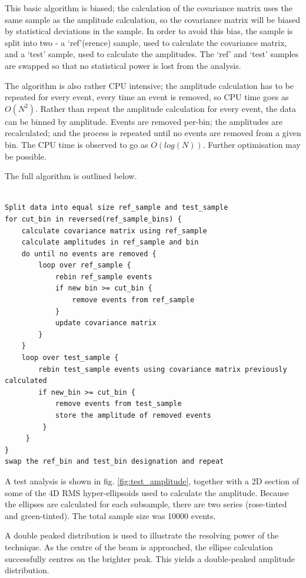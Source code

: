 This basic algorithm is biased; the calculation of the covariance matrix uses
the same sample as the amplitude calculation, so the covariance matrix will be
biased by statistical deviations in the sample. In order to avoid this bias,
the sample is split into two - a `ref'(erence) sample, used to calculate the
covariance matrix, and a `test' sample, used to calculate the amplitudes. The
`ref' and `test' samples are swapped so that no statistical power is lost
from the analysis.

The algorithm is also rather CPU intensive; the amplitude
calculation has to be repeated for every event, every time an event is removed,
so CPU time goes as $O(N^2)$. Rather than repeat the amplitude calculation for
every event, the data can be binned by amplitude. Events are removed per-bin; 
the amplitudes are recalculated; and the process is repeated until no events are 
removed from a given bin. The CPU time is observed to go as $O(log(N))$. Further 
optimisation may be possible. 

The full algorithm is outlined below.

\begin{minipage}{0.8\textwidth}
\begin{verbatim}

Split data into equal size ref_sample and test_sample
for cut_bin in reversed(ref_sample_bins) {
    calculate covariance matrix using ref_sample
    calculate amplitudes in ref_sample and bin
    do until no events are removed {
        loop over ref_sample {
            rebin ref_sample events
            if new bin >= cut_bin {
                remove events from ref_sample 
            }
            update covariance matrix
        } 
    }
    loop over test_sample {
        rebin test_sample events using covariance matrix previously calculated
        if new_bin >= cut_bin {
            remove events from test_sample
            store the amplitude of removed events
         }
     }
}
swap the ref_bin and test_bin designation and repeat

\end{verbatim}
\end{minipage}

A test analysis is shown in fig. \ref{fig:test_amplitude}, together with a 2D
section of some of the 4D RMS hyper-ellipsoids used to calculate the amplitude. 
Because the ellipses are calculated for each subsample, there are two series 
(rose-tinted and green-tinted). The total sample size was 10000 events.

A double peaked distribution is used to illustrate the resolving power of the 
technique. As the centre of the beam is approached, the ellipse calculation 
successfully centres on the brighter peak. This yields a double-peaked amplitude 
distribution.

